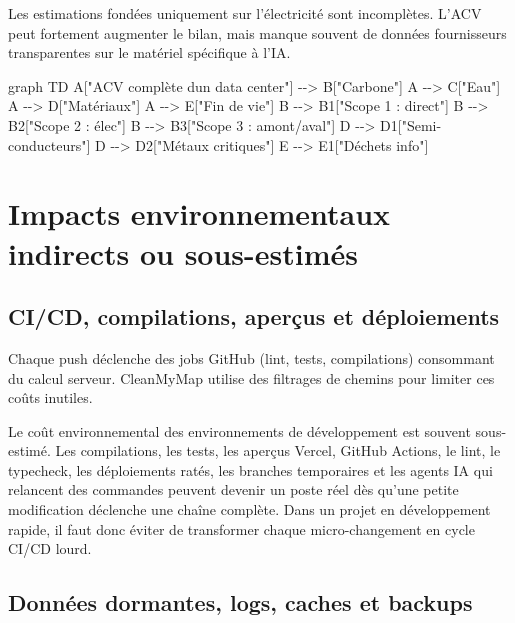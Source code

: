 \documentclass[
  10pt,
  a4paper,
  DIV=11,
  numbers=noendperiod,
  oneside]{scrreprt}
\newenvironment{Shaded}{\begin{snugshade}}{\end{snugshade}}
\newcommand{\NormalTok}[1]{\textcolor[rgb]{0.00,0.23,0.31}{#1}}
\begin{document}
Les estimations fondées uniquement sur l'électricité sont incomplètes.
L'ACV peut fortement augmenter le bilan, mais manque souvent de données
fournisseurs transparentes sur le matériel spécifique à l'IA.

\begin{Shaded}
\begin{Highlighting}[]
\NormalTok{graph TD}
\NormalTok{    A["ACV complète d\textquotesingle{}un data center"] {-}{-}\textgreater{} B["Carbone"]}
\NormalTok{    A {-}{-}\textgreater{} C["Eau"]}
\NormalTok{    A {-}{-}\textgreater{} D["Matériaux"]}
\NormalTok{    A {-}{-}\textgreater{} E["Fin de vie"]}
\NormalTok{    B {-}{-}\textgreater{} B1["Scope 1 : direct"]}
\NormalTok{    B {-}{-}\textgreater{} B2["Scope 2 : élec"]}
\NormalTok{    B {-}{-}\textgreater{} B3["Scope 3 : amont/aval"]}
\NormalTok{    D {-}{-}\textgreater{} D1["Semi{-}conducteurs"]}
\NormalTok{    D {-}{-}\textgreater{} D2["Métaux critiques"]}
\NormalTok{    E {-}{-}\textgreater{} E1["Déchets info"]}
\end{Highlighting}
\end{Shaded}

\section{Impacts environnementaux indirects ou
sous-estimés}\label{impacts-environnementaux-indirects-ou-sous-estimuxe9s}

\subsection{CI/CD, compilations, aperçus et
déploiements}\label{cicd-compilations-aperuxe7us-et-duxe9ploiements}

Chaque push déclenche des jobs GitHub (lint, tests, compilations)
consommant du calcul serveur. CleanMyMap utilise des filtrages de
chemins pour limiter ces coûts inutiles.

Le coût environnemental des environnements de développement est souvent
sous-estimé. Les compilations, les tests, les aperçus Vercel, GitHub
Actions, le lint, le typecheck, les déploiements ratés, les branches
temporaires et les agents IA qui relancent des commandes peuvent devenir
un poste réel dès qu'une petite modification déclenche une chaîne
complète. Dans un projet en développement rapide, il faut donc éviter de
transformer chaque micro-changement en cycle CI/CD lourd.

\subsection{Données dormantes, logs, caches et
backups}\label{donnuxe9es-dormantes-logs-caches-et-backups}
\end{document}
